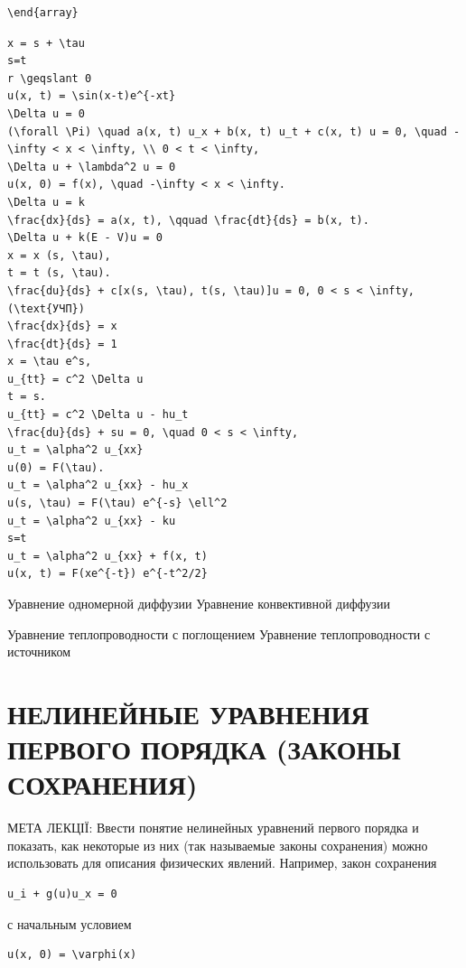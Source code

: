 \documentclass[
  ukrainian,
]{article}
\begin{document}
\begin{verbatim}
\end{array}
\end{verbatim}

\begin{verbatim}
x = s + \tau
s=t
r \geqslant 0
u(x, t) = \sin(x-t)e^{-xt}
\Delta u = 0
(\forall \Pi) \quad a(x, t) u_x + b(x, t) u_t + c(x, t) u = 0, \quad -\infty < x < \infty, \\ 0 < t < \infty,
\Delta u + \lambda^2 u = 0
u(x, 0) = f(x), \quad -\infty < x < \infty.
\Delta u = k
\frac{dx}{ds} = a(x, t), \qquad \frac{dt}{ds} = b(x, t).
\Delta u + k(E - V)u = 0
x = x (s, \tau),
t = t (s, \tau).
\frac{du}{ds} + c[x(s, \tau), t(s, \tau)]u = 0, 0 < s < \infty,
(\text{УЧП})
\frac{dx}{ds} = x
\frac{dt}{ds} = 1
x = \tau e^s,
u_{tt} = c^2 \Delta u
t = s.
u_{tt} = c^2 \Delta u - hu_t
\frac{du}{ds} + su = 0, \quad 0 < s < \infty,
u_t = \alpha^2 u_{xx}
u(0) = F(\tau).
u_t = \alpha^2 u_{xx} - hu_x
u(s, \tau) = F(\tau) e^{-s} \ell^2
u_t = \alpha^2 u_{xx} - ku
s=t
u_t = \alpha^2 u_{xx} + f(x, t)
u(x, t) = F(xe^{-t}) e^{-t^2/2}
\end{verbatim}

Уравнение одномерной диффузии Уравнение конвективной диффузии

Уравнение теплопроводности с поглощением Уравнение теплопроводности с
источником

\section{НЕЛИНЕЙНЫЕ УРАВНЕНИЯ ПЕРВОГО ПОРЯДКА (ЗАКОНЫ
СОХРАНЕНИЯ)}\label{ux43dux435ux43bux438ux43dux435ux439ux43dux44bux435-ux443ux440ux430ux432ux43dux435ux43dux438ux44f-ux43fux435ux440ux432ux43eux433ux43e-ux43fux43eux440ux44fux434ux43aux430-ux437ux430ux43aux43eux43dux44b-ux441ux43eux445ux440ux430ux43dux435ux43dux438ux44f}

МЕТА ЛЕКЦІЇ: Ввести понятие нелинейных уравнений первого порядка и
показать, как некоторые из них (так называемые законы сохранения) можно
использовать для описания физических явлений. Например, закон сохранения

\begin{verbatim}
u_i + g(u)u_x = 0
\end{verbatim}

с начальным условием

\begin{verbatim}
u(x, 0) = \varphi(x)
\end{verbatim}
\end{document}
